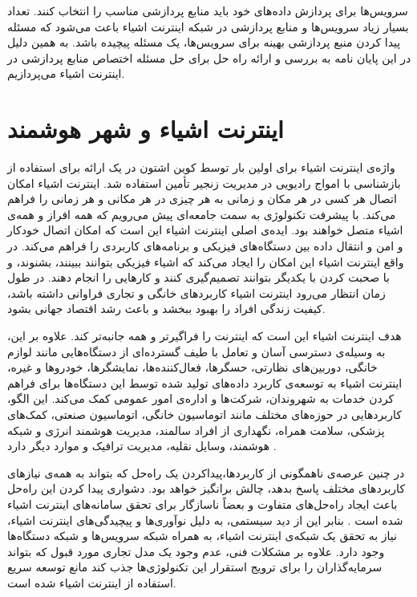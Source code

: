     سرویس‌ها برای پردازش داده‌های خود باید منابع پردازشی مناسب را انتخاب کنند.
    تعداد بسیار زیاد سرویس‌ها و منابع پردازشی در شبکه اینترنت اشیاء باعث می‌شود که مسئله پیدا کردن منبع پردازشی بهینه برای سرویس‌ها، یک مسئله پیچیده باشد.
    به همین دلیل در این پایان نامه به بررسی و ارائه راه حل برای حل مسئله اختصاص منابع پردازشی در اینترنت اشیاء می‌پردازیم.

    \section{اینترنت اشیاء و شهر هوشمند}
    واژه‌ی اینترنت اشیاء برای اولین بار توسط کوین اشتون در یک ارائه برای استفاده از بازشناسی با امواج رادیویی در مدیریت زنجیر تأمین استفاده شد\cite{shton2009that}.
    اینترنت اشیاء امکان اتصال هر کسی در هر مکان و زمانی به هر چیزی در هر مکانی و هر زمانی را فراهم می‌کند.
    با پیشرفت تکنولوژی به سمت جامعه‌ای پیش می‌رویم که همه افراز و همه‌ی اشیاء متصل خواهند بود\cite{zheng2011internet}.
    ایده‌ی اصلی اینترنت اشیاء این است که امکان اتصال خودکار و امن و انتقال داده‌ بین دستگاه‌های فیزیکی و برنامه‌های کاربردی را فراهم می‌کند.
    در واقع اینترنت اشیاء این امکان را ایجاد می‌کند که اشیاء فیزیکی بتوانند ببینند، بشنوند، و با صحبت کردن با یکدیگر بتوانند تصمیم‌گیری کنند و کار‌هایی را انجام دهند\cite{al2015internet}.
    در طول زمان انتظار می‌رود اینترنت اشیاء کاربرد‌های خانگی و تجاری فراوانی داشته باشد، کیفیت زندگی افراد را بهبود ببخشد و باعث رشد اقتصاد جهانی بشود.

    هدف اینترنت اشیاء این است که اینترنت را فراگیرتر و همه جانبه‌تر کند.
    علاوه بر این، به وسیله‌ی دسترسی آسان و تعامل با طیف گسترده‌ای از دستگاه‌هایی مانند لوازم خانگی، دوربین‌های نظارتی، حسگر‌ها، فعال‌کننده‌ها، نمایشگر‌ها، خودرو‌ها و غیره، اینترنت اشیاء به توسعه‌ی کاربرد داده‌های تولید شده توسط این دستگاه‌ها برای فراهم کردن خدمات به شهروندان، شرکت‌ها و اداره‌ی امور عمومی کمک می‌کند.
    این الگو، کاربرد‌هایی در حوزه‌های مختلف مانند اتوماسیون خانگی، اتوماسیون صنعتی، کمک‌های پزشکی، سلامت همراه، نگهداری از افراد سالمند، مدیریت هوشمند انرژی و شبکه هوشمند، وسایل نقلیه، مدیریت ترافیک و موارد دیگر دارد \cite{bellavista2013convergence}.

    در چنین عرصه‌ی ناهمگونی از کاربرد‌ها،پیداکردن یک راه‌حل که بتواند به همه‌ی نیاز‌های کاربرد‌های مختلف پاسخ بدهد، چالش برانگیز خواهد بود.
    دشواری پیدا کردن این راه‌حل باعث ایجاد راه‌حل‌های متفاوت و بعضاً ناسازگار برای تحقق سامانه‌های اینترنت اشیاء شده است \cite{zanella2014internet}.
    بنابر این از دید سیستمی، به دلیل نوآوری‌ها و پیچیدگی‌های اینترنت اشیاء، نیاز به تحقق یک شبکه‌ی اینترنت اشیاء، به همراه شبکه سرویس‌ها و شبکه دستگاه‌ها وجود دارد.
    علاوه بر مشکلات فنی، عدم وجود یک مدل تجاری مورد قبول که بتواند سرمایه‌گذاران را برای ترویج استقرار این تکنولوژی‌ها جذب کند مانع توسعه سریع استفاده از اینترنت اشیاء شده است\cite{laya2013investing}.

